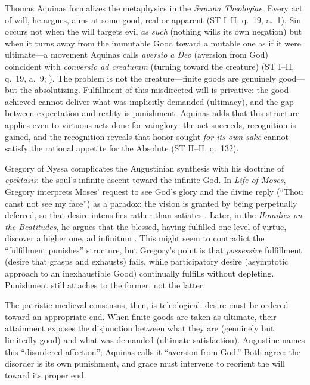 Thomas Aquinas formalizes the metaphysics in the \emph{Summa Theologiae}. Every act of will,
he argues, aims at some good, real or apparent (ST I--II, q.~19, a.~1). Sin occurs not when
the will targets evil \emph{as such} (nothing wills its own negation) but when it turns away
from the immutable Good toward a mutable one as if it were ultimate---a movement Aquinas calls
\emph{aversio a Deo} (aversion from God) coincident with \emph{conversio ad creaturam}
(turning toward the creature) (ST I--II, q.~19, a.~9; \parencite{AquinasST1947}). The
problem is not the creature---finite goods are genuinely good---but the absolutizing.
Fulfillment of this misdirected will is privative: the good achieved cannot deliver what was
implicitly demanded (ultimacy), and the gap between expectation and reality is punishment.
Aquinas adds that this structure applies even to virtuous acts done for vainglory: the act
succeeds, recognition is gained, and the recognition reveals that honor sought \emph{for its
	own sake} cannot satisfy the rational appetite for the Absolute (ST II--II, q.~132).

Gregory of Nyssa complicates the Augustinian synthesis with his doctrine of \emph{epektasis}:
the soul's infinite ascent toward the infinite God. In \emph{Life of Moses}, Gregory interprets
Moses' request to see God's glory and the divine reply (``Thou canst not see my face'') as a
paradox: the vision is granted by being perpetually deferred, so that desire intensifies
rather than satiates \parencite{GregoryMoses1978}. Later, in the \emph{Homilies on the
	Beatitudes}, he argues that the blessed, having fulfilled one level of virtue, discover a
higher one, ad infinitum \parencite[p.~31]{GregoryBeatitudes1954}. This might seem to
contradict the ``fulfillment punishes'' structure, but Gregory's point is that
\emph{possessive} fulfillment (desire that grasps and exhausts) fails, while participatory
desire (asymptotic approach to an inexhaustible Good) continually fulfills without depleting.
Punishment still attaches to the former, not the latter.

The patristic-medieval consensus, then, is teleological: desire must be ordered toward an
appropriate end. When finite goods are taken as ultimate, their attainment exposes the
disjunction between what they are (genuinely but limitedly good) and what was demanded
(ultimate satisfaction). Augustine names this ``disordered affection''; Aquinas calls it
``aversion from God.'' Both agree: the disorder is its own punishment, and grace must
intervene to reorient the will toward its proper end.
